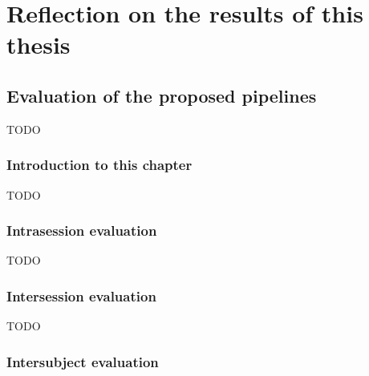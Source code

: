 


\part{Reflection on the results of this thesis}
\label{part:reflection}

\chapter{Evaluation of the proposed pipelines}
\label{ch:evaluation}
TODO

\section{Introduction to this chapter}
\label{sec:evaluation_introduction}

TODO

\section{Intrasession evaluation}
\label{sec:evaluation_intrasession}


TODO

\section{Intersession evaluation}
\label{sec:evaluation_intersession}


TODO

\section{Intersubject evaluation}
\label{sec:evaluation_intersubject}


